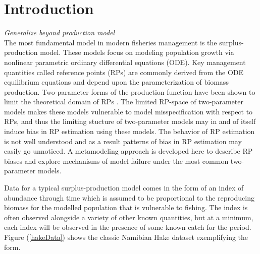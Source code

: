 \documentclass[11pt]{ucscthesis}
\begin{document}

%
\linenumbers

%
\chapter{\color{blue}Introduction \label{intro}}
\clearpage

{\color{blue} {\it Generalize beyond production model}\\

The most fundamental model in modern fisheries management is the surplus-production
model. These models focus on modeling population growth via nonlinear
parametric ordinary differential equations (ODE). Key management quantities
called reference points (RPs) are commonly derived from the ODE equilibrium
equations and depend upon the parameterization of biomass production.
Two-parameter forms of the production function have been shown to
limit the theoretical domain of RPs \cite{mangel_perspective_2013}.
The limited RP-space of two-parameter models makes these models vulnerable to
model misspecification with respect to RPs, and thus the limiting stucture of
two-parameter models may in and of itself induce bias in RP estimation using
these models. The behavior of RP estimation is not well understood and as a
result patterns of bias in RP estimation may easily go unnoticed. A
metamodeling approach is developed here to describe RP biases and explore
mechanisms of model failure under the most common two-parameter models. %

Data for a typical surplus-production model comes in the form of an index
of abundance through time which is assumed to be proportional to the reproducing
biomass for the modelled population that is vulnerable to fishing. The index
is often observed alongside a variety of other known quantities, but at a
minimum, each index will be observed in the presence of some known catch for
the period. Figure (\ref{hakeData}) shows the classic Namibian Hake dataset
\cite{punt_model_1988, hilborn_ecological_1997, mangel_theoretical_2006}
exemplifying the form.

}
\end{document}
